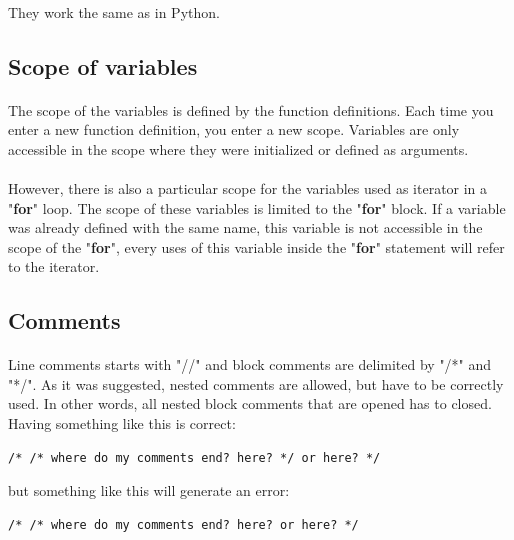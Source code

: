 \documentclass[12pt,a4paper]{article}
\begin{document}
\paragraph{}
They work the same as in Python.

\subsection{Scope of variables}

\paragraph{}
The scope of the variables is defined by the function definitions. Each time you enter a new function definition, you enter a new scope. Variables are only accessible in the scope where they were initialized or defined as arguments.

\paragraph{}
However, there is also a particular scope for the variables used as iterator in a "\textbf{for}" loop. The scope of these variables is limited to the "\textbf{for}" block. If a variable was already defined with the same name, this variable is not accessible in the scope of the "\textbf{for}", every uses of this variable inside the "\textbf{for}" statement will refer to the iterator.

\subsection{Comments}

\paragraph{}
Line comments starts with "//" and block comments are delimited by "/*" and "*/". As it was suggested, nested comments are allowed, but have to be correctly used. In other words, all nested block comments that are opened has to closed. Having something like this is correct:
\begin{verbatim}
/* /* where do my comments end? here? */ or here? */
\end{verbatim}
but something like this will generate an error:
\begin{verbatim}
/* /* where do my comments end? here? or here? */
\end{verbatim}
\end{document}

